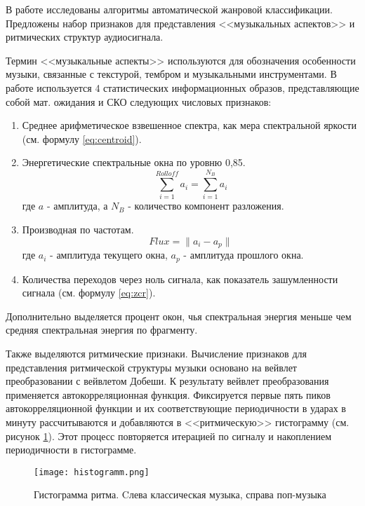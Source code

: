В работе\cite{src1} исследованы алгоритмы автоматической жанровой классификации. Предложены набор признаков для представления <<музыкальных аспектов>> и ритмических структур аудиосигнала. 

Термин <<музыкальные аспекты>> используются для обозначения особенности музыки, связанные с текстурой, тембром и музыкальными инструментами. В работе используется 4 статистических информационных образов, представляющие собой мат. ожидания и СКО следующих числовых признаков:

\begin{enumerate}[label=\arabic*.]
\item Среднее арифметическое взвешенное спектра, как мера спектральной яркости (см. формулу \ref{eq:centroid}).
\item Энергетические спектральные окна по уровню 0,85.
\begin{equation}\label{eq:rolloff}
 \sum\limits_{i=1}^{Rolloff} a_i =  \sum\limits_{i=1}^{N_B} a_i
\end{equation}  
где $ a $ - амплитуда,  а $N_B$ - количество компонент разложения. 
\item Производная по частотам.
\begin{equation}\label{eq:flux}
Flux = \lVert a_i - a_p \rVert
\end{equation}  
где $a_i$ - амплитуда текущего окна, $a_p$ - амплитуда прошлого окна.
\item Количества переходов через ноль сигнала, как показатель зашумленности сигнала (см. формулу \ref{eq:zcr}).
\end{enumerate}

Дополнительно выделяется процент окон, чья спектральная энергия меньше чем средняя спектральная энергия по фрагменту.

Также выделяются ритмические признаки. Вычисление признаков для представления ритмической структуры музыки основано на вейвлет преобразовании с вейвлетом Добеши. К результату вейвлет преобразования применяется автокорреляционная функция. Фиксируется первые пять пиков автокорреляционной функции и их соответствующие периодичности в ударах в минуту рассчитываются и добавляются в <<ритмическую>> гистограмму (см. рисунок \ref{fig:domain:histogramm}). Этот процесс повторяется итерацией по сигналу и накоплением периодичности в гистограмме. 

\begin{figure}[ht]
\centering
  \texttt{[image: histogramm.png]}
  \caption{Гистограмма ритма. Cлева классическая музыка, справа поп-музыка}
  \label{fig:domain:histogramm}
\end{figure}

